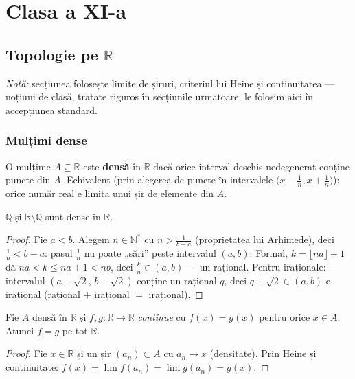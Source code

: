 \chapter{Clasa a XI-a}
\section{Topologie pe $\mathbb{R}$}

\emph{Notă:} secțiunea folosește limite de șiruri, criteriul lui Heine și continuitatea --- noțiuni de clasă, tratate riguros în secțiunile următoare; le folosim aici în accepțiunea standard.

\subsection{Mulțimi dense}

\begin{definitie}
O mulțime $A\subseteq\mathbb{R}$ este \textbf{densă} în $\mathbb{R}$ dacă orice interval deschis nedegenerat conține puncte din $A$. Echivalent (prin alegerea de puncte în intervalele $\big(x-\frac1n,x+\frac1n\big)$): orice număr real e limita unui șir de elemente din $A$.
\end{definitie}

\begin{teorema}
$\mathbb{Q}$ și $\mathbb{R}\setminus\mathbb{Q}$ sunt dense în $\mathbb{R}$.
\end{teorema}
\begin{proof}
Fie $a<b$. Alegem $n\in\mathbb{N}^*$ cu $n>\frac{1}{b-a}$ (proprietatea lui Arhimede), deci $\frac1n<b-a$: pasul $\frac1n$ nu poate „sări'' peste intervalul $(a,b)$. Formal, $k=\lfloor na\rfloor+1$ dă $na<k\le na+1<nb$, deci $\frac kn\in(a,b)$ --- un rațional. Pentru iraționale: intervalul $(a-\sqrt2,\,b-\sqrt2)$ conține un rațional $q$, deci $q+\sqrt2\in(a,b)$ e irațional (rațional $+$ irațional $=$ irațional).
\end{proof}

\begin{teorema}
Fie $A$ densă în $\mathbb{R}$ și $f,g:\mathbb{R}\to\mathbb{R}$ \emph{continue} cu $f(x)=g(x)$ pentru orice $x\in A$. Atunci $f=g$ pe tot $\mathbb{R}$.
\end{teorema}
\begin{proof}
Fie $x\in\mathbb{R}$ și un șir $(a_n)\subset A$ cu $a_n\to x$ (densitate). Prin Heine și continuitate: $f(x)=\lim f(a_n)=\lim g(a_n)=g(x)$.
\end{proof}

